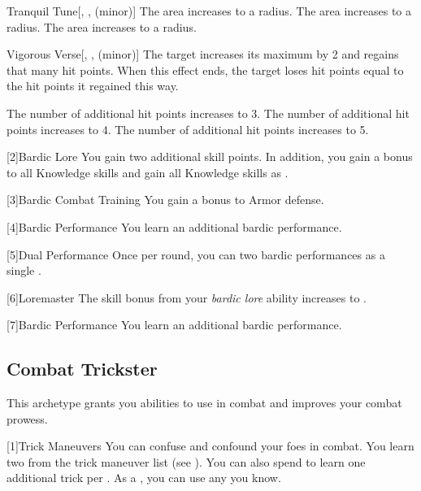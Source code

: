 {\begin{freeability}{Tranquil Tune}[, ,  (minor)]
                \rankline
                 The area increases to a \arealarge radius.
                 The area increases to a \areahuge radius.
                 The area increases to a \areaext radius.
            \end{freeability}

            \begin{freeability}{Vigorous Verse}[, ,  (minor)]
                The target increases its maximum  by 2 and regains that many hit points.
                When this effect ends, the target loses hit points equal to the hit points it regained this way.

                \rankline
                 The number of additional hit points increases to 3.
                 The number of additional hit points increases to 4.
                 The number of additional hit points increases to 5.
            \end{freeability}
        }

        [2]{Bardic Lore} You gain two additional skill points.
        In addition, you gain a  bonus to all Knowledge skills and gain all Knowledge skills as .

        [3]{Bardic Combat Training} You gain a  bonus to Armor defense.

        [4]{Bardic Performance}
        You learn an additional bardic performance.

        [5]{Dual Performance}
        Once per round, you can  two bardic performances as a single .

        [6]{Loremaster} The skill bonus from your \textit{bardic lore} ability increases to .

        [7]{Bardic Performance}
        You learn an additional bardic performance.

    \subsection{Combat Trickster}
        This archetype grants you abilities to use in combat and improves your combat prowess.

        [1]{Trick Maneuvers}
        You can confuse and confound your foes in combat.
        You learn two  from the trick maneuver list (see ).
        You can also spend  to learn one additional trick  per .
        As a , you can use any  you know.


